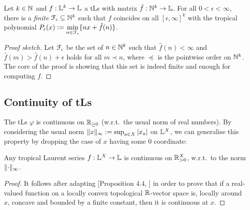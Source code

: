 \begin{theorem}\label{theorem:fepsilon}
 Let $k\in\mathbb{N}$ and $f:\mathbb{L}^k\to\mathbb{L}$ a tLs with matrix $\hat{f}:\mathbb{N}^k\to\mathbb{L}$.
 For all $0<\epsilon<\infty$, there is a \emph{finite} $\mathcal{F}_\epsilon \subseteq \mathbb{N}^k$ such that 
% 
$f$ coincides on all $[\epsilon,\infty]^k$ with the tropical {polynomial} $P_\epsilon(x):=\min\limits_{n\in \mathcal{F}_\epsilon}\{nx+\hat{f}(n)\}$.
\end{theorem}
\begin{proof}[Proof sketch]
Let $\mathcal{F}_\epsilon$ be the set of $n\in\mathbb{N}^{k}$ such that 
$\widehat f(n)<\infty$ and $\widehat f(m)> \widehat f(n)+\epsilon$ holds for all $m\prec n$, where $\preceq$ is the pointwise order on $\mathbb{N}^k$.
The core of the proof is showing that this set is indeed finite and enough for computing $f$.
\end{proof}




\subsection{Continuity of tLs}\label{subsec:cont}%

The tLs $\varphi$ is continuous on $\mathbb{R}_{\geq0}$ (w.r.t.\ the usual norm of real numbers).
By considering the usual norm $\lVert x\rVert_\infty:=\sup_{a\in X} \left\lvert x_a\right\rvert$ on $\mathbb{L}^X$, we can generalise this property by dropping the case of $x$ having some $0$ coordinate:

\begin{theorem}\label{thm:cont}
 Any tropical Laurent series $f:\mathbb{L}^X\to\mathbb{L}$ is continuous on $\mathbb{R}_{>0}^X$, w.r.t.\ to the norm $\lVert\cdot\rVert_\infty$.
\end{theorem}
\begin{proof}
 It follows after adapting [Proposition 4.4, \cite{Cobzas2017}] in order to prove that if a real-valued function on a locally convex topological $\mathbb{R}$-vector space is, locally around $x$, concave and bounded by a finite constant, then it is continuous at $x$.
\end{proof}

